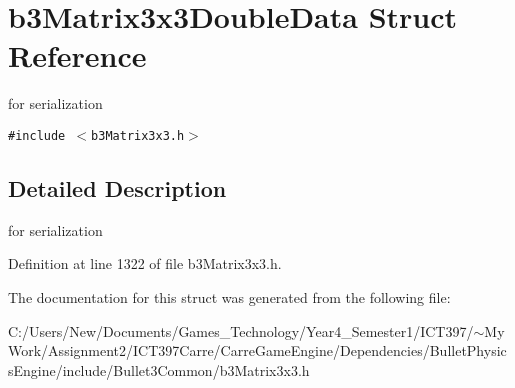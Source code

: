 \hypertarget{structb3_matrix3x3_double_data}{
\section{b3Matrix3x3DoubleData Struct Reference}
\label{structb3_matrix3x3_double_data}
}
for serialization  


{\tt \#include $<$b3Matrix3x3.h$>$}



\subsection{Detailed Description}
for serialization 

Definition at line 1322 of file b3Matrix3x3.h.

The documentation for this struct was generated from the following file:\begin{CompactItemize}
\item 
C:/Users/New/Documents/Games\_\-Technology/Year4\_\-Semester1/ICT397/$\sim$My Work/Assignment2/ICT397Carre/CarreGameEngine/Dependencies/BulletPhysicsEngine/include/Bullet3Common/b3Matrix3x3.h\end{CompactItemize}
